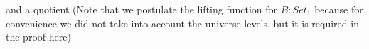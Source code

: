 and a quotient (Note that we postulate the lifting function for $B : Set_1$ because for convenience we did not take into account the universe levels, but it is required in the proof here)

\begin{code}\>\<%
\\
\>[0]\<[2]%
\>[2]\AgdaSymbol{\{} \AgdaSymbol{:} \AgdaSymbol{\}}\<%
\\
\>[0]\<[2]%
\>[2]\AgdaSymbol{\{} \AgdaSymbol{:}  \AgdaSymbol{\}}\<%
\\
\>[2]\<[4]%
\>[4]\<%
\\
\>[0]\<[2]%
\>[2]  \<%
\\
\>\<\end{code}
